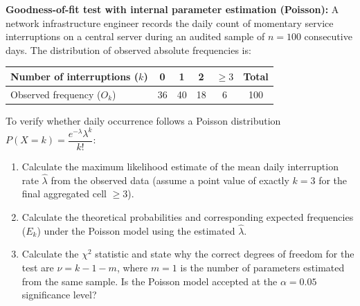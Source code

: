 \begin{problema}
	\label{prob:chi-analit-poisson}
	\textbf{Goodness-of-fit test with internal parameter estimation (Poisson):}
	A network infrastructure engineer records the daily count of momentary service interruptions on a central server during an audited sample of $n = 100$ consecutive days. The distribution of observed absolute frequencies is:
	\begin{center}
		\begin{tabular}{|l|c|c|c|c|c|}\hline
			Number of interruptions ($k$) & 0 & 1 & 2 & $\ge 3$ & Total \\\hline
			Observed frequency ($O_k$) & 36 & 40 & 18 & 6 & 100 \\\hline
		\end{tabular}
	\end{center}
	To verify whether daily occurrence follows a Poisson distribution $P(X = k) = \dfrac{e^{-\lambda}\lambda^k}{k!}$:
	\begin{enumerate}
		\item Calculate the maximum likelihood estimate of the mean daily interruption rate $\hat{\lambda}$ from the observed data (assume a point value of exactly $k=3$ for the final aggregated cell $\ge 3$).
		\item Calculate the theoretical probabilities and corresponding expected frequencies ($E_k$) under the Poisson model using the estimated $\hat{\lambda}$.
		\item Calculate the $\chi^2$ statistic and state why the correct degrees of freedom for the test are $\nu = k - 1 - m$, where $m = 1$ is the number of parameters estimated from the same sample. Is the Poisson model accepted at the $\alpha = 0.05$ significance level?
	\end{enumerate}
\end{problema}

